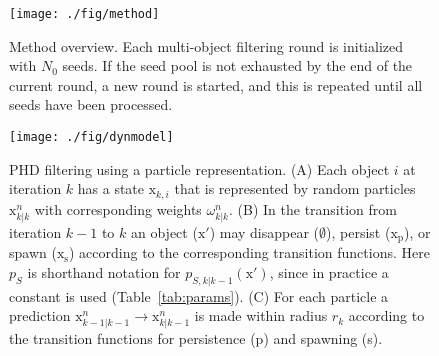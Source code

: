 \documentclass[noinfo,nocrop,final]{bioinfo}
\begin{document}
\begin{figure}[!t]
\centering
\texttt{[image: ./fig/method]}
\vspace{-1.5\baselineskip}
\caption{Method overview. Each multi-object filtering round is initialized with $N_0$ seeds. If the seed pool is not exhausted by the end of the current round, a new round is started, and this is repeated until all seeds have been processed.}
\label{fig:method}
\end{figure}

\begin{figure*}[!b]
\centering
\texttt{[image: ./fig/dynmodel]}
\vspace{-0.5\baselineskip}
\caption{PHD filtering using a particle representation. (A) Each object $i$ at iteration $k$ has a state $\mathrm{x}_{k,i}$ that is represented by random particles $\mathrm{x}_{k|k}^{n}$ with corresponding weights $\omega_{k|k}^{n}$. (B) In the transition from iteration $k-1$ to $k$ an object ($\mathrm{x}'$) may disappear ($\emptyset$), persist ($\mathrm{x}_{\mathrm{p}}$), or spawn ($\mathrm{x}_{\mathrm{s}}$) according to the corresponding transition functions. Here $p_S$ is shorthand notation for $p_{S,k|k-1}(\mathrm{x}')$, since in practice a constant is used (Table~\ref{tab:params}). (C) For each particle a prediction $\mathrm{x}_{k-1|k-1}^n \rightarrow \mathrm{x}_{k|k-1}^n$ is made within radius $r_k$ according to the transition functions for persistence (p) and spawning (s).}
\label{fig:dynamics-model}
\end{figure*}
\end{document}
